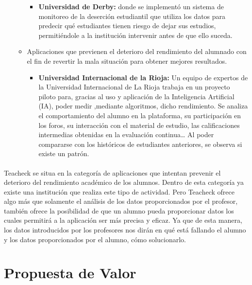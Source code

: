 \begin{itemize}
\begin{itemize}
\begin{itemize}
\item \textbf{Universidad de Derby:} donde se implementó un sistema de monitoreo de la deserción estudiantil que utiliza los datos para predecir qué estudiantes tienen riesgo de dejar sus estudios, permitiéndole a la institución intervenir antes de que ello suceda.\cite{riesgoDejarEstudios}
\end{itemize}
\item Aplicaciones que previenen el deterioro del rendimiento del alumnado con el fin de revertir la mala situación para obtener mejores resultados.
\begin{itemize}
\item \textbf{Universidad Internacional de la Rioja:} Un equipo de expertos de la Universidad Internacional de La Rioja trabaja en un proyecto piloto para, gracias al uso y aplicación de la Inteligencia Artificial (IA), poder medir ,mediante algoritmos, dicho rendimiento. Se analiza el comportamiento del alumno en la plataforma, su participación en los foros, su interacción con el material de estudio, las calificaciones intermedias obtenidas en la evaluación continua… Al poder compararse con los históricos de estudiantes anteriores, se observa si existe un patrón.\cite{rendimientoAlumnos}
\end{itemize}
\end{itemize}
\end{itemize}

\paragraph{} Teacheck se situa en la categoría de aplicaciones que intentan prevenir el deterioro del rendimiento académico de los alumnos. Dentro de esta categoría ya existe una institución que realiza este tipo de actividad. Pero Teacheck ofrece algo más que solamente el análisis de los datos proporcionados por el profesor, también ofrece la posibilidad de que un alumno pueda proporcionar datos los cuales permitirá a la aplicación ser más precisa y eficaz.
Ya que de esta manera, los datos introducidos por los profesores nos dirán en qué está fallando el alumno y los datos proporcionados por el alumno, cómo solucionarlo.


\section{Propuesta de Valor}

